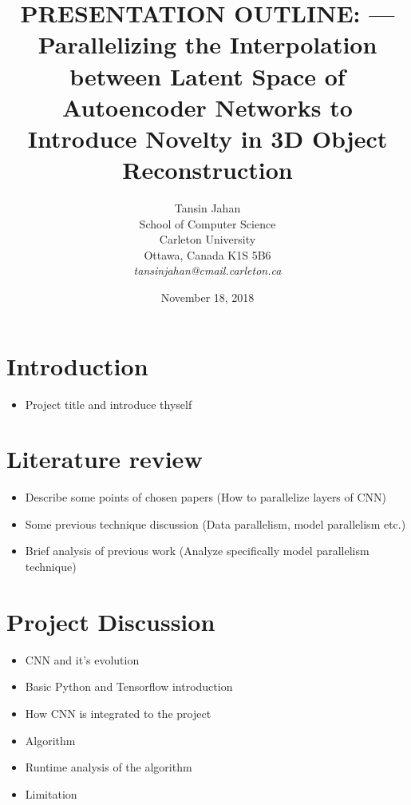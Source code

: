 \documentclass[11pt]{article}       %
\newenvironment{slide}[1]        {\section{#1} \begin{itemize}}%
                                 {\end{itemize}}
\begin{document}


\title{PRESENTATION OUTLINE: --- Parallelizing the Interpolation between Latent Space of Autoencoder Networks to Introduce Novelty in 3D Object Reconstruction}


\author{
Tansin Jahan\\
School of Computer Science\\
Carleton University\\
Ottawa, Canada K1S 5B6\\
{\em tansinjahan@cmail.carleton.ca}
} %
\date{November 18, 2018}
\maketitle

\begin{slide}{Introduction}
\item Project title and introduce thyself
\end{slide}

\begin{slide}{Literature review}
\item Describe some points of chosen papers (How to parallelize layers of CNN) 
\item Some previous technique discussion (Data parallelism, model parallelism etc.)
\item Brief analysis of previous work (Analyze specifically model parallelism technique)
\end{slide}

\begin{slide}{Project Discussion}
\item CNN and it's evolution
\item Basic Python and Tensorflow introduction
\item How CNN is integrated to the project
\item Algorithm
\item Runtime analysis of the algorithm
\item Limitation
\end{slide}
\end{document}
